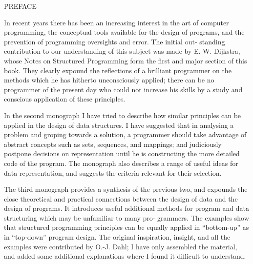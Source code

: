 PREFACE

In recent years there has been an increasing interest in the art of computer programming, the conceptual tools available for the design of programs, and the prevention of programming oversights and error. The initial out- standing contribution to our understanding of this subject was made by E. W. Dijkstra, whose Notes on Structured Programming form the first and major section of this book. They clearly expound the reflections of a brilliant programmer on the methods which he has hitherto unconsciously applied; there can be no programmer of the present day who could not increase his skills by a study and conscious application of these principles.

In the second monograph I have tried to describe how similar principles can be applied in the design of data structures. I have suggested that in analysing a problem and groping towards a solution, a programmer should take advantage of abstract concepts such as sets, sequences, and mappings; and judiciously postpone decisions on representation until he is constructing the more detailed code of the program. The monograph also describes a range of useful ideas for data representation, and suggests the criteria relevant for their selection.

The third monograph provides a synthesis of the previous two, and expounds the close theoretical and practical connections between the design of data and the design of programs. It introduces useful additional methods for program and data structuring which may be unfamiliar to many pro- grammers. The examples show that structured programming principles can be equally applied in “bottom-up” as in “top-down” program design. The original inspiration, insight, and all the examples were contributed by O.-J. Dahl; I have only assembled the material, and added some additional explanations where I found it difficult to understand.